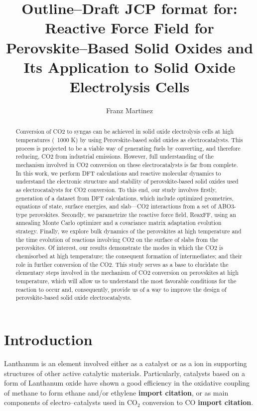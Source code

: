\documentclass[journal=jpcafh,manuscript=article]{achemso}
\author{Franz Martinez}
\affiliation{Schulich School of Engineering, University of Calgary, Calgary, Alberta, Canada}
\title{Outline--Draft JCP format for: Reactive Force Field for Perovskite--Based Solid Oxides and Its Application to Solid Oxide Electrolysis Cells}
\begin{document}
\begin{abstract}
Conversion of CO2 to syngas can be achieved in solid oxide electrolysis cells at high temperatures (~1000 K) by using Perovskite-based solid oxides as electrocatalysts. This process is projected to be a viable way of generating fuels by converting, and therefore reducing, CO2 from industrial emissions. However, full understanding of the mechanism involved in CO2 conversion on these electrocatalysts is far from complete. In this work, we perform DFT calculations and reactive molecular dynamics to understand the electronic structure and stability of perovskite-based solid oxides used as electrocatalysts for CO2 conversion. To this end, our study involves firstly, generation of a dataset from DFT calculations, which include optimized geometries, equations of state, surface energies, and slab—CO2 interactions from a set of ABO3-type perovskites. Secondly, we parametrize the reactive force field, ReaxFF, using an annealing Monte Carlo optimizer and a covariance matrix adaptation evolution strategy. Finally, we explore bulk dynamics of the perovskites at high temperature and the time evolution of reactions involving CO2 on the surface of slabs from the perovskites. Of interest, our results demonstrate the modes in which the CO2 is chemisorbed at high temperature; the consequent formation of intermediates; and their role in further conversion of the CO2. This study serves as a base to elucidate the elementary steps involved in the mechanism of CO2 conversion on perovskites at high temperature, which will allow us to understand the most favorable conditions for the reaction to occur and, consequently, provide us of a way to improve the design of perovskite-based solid oxide electrocatalysts.
\end{abstract}


\section{Introduction}

Lanthanum is an element involved either as a catalyst or as a ion in supporting structures of other active catalytic materials.
Particularly, catalysts based on a form of Lanthanum oxide have shown a good efficiency in the oxidative coupling of methane to form ethane and/or ethylene \textbf{import citation}, or as main components of electro--catalysts used in CO$_2$ conversion to CO \textbf{import citation}.

\end{document}
